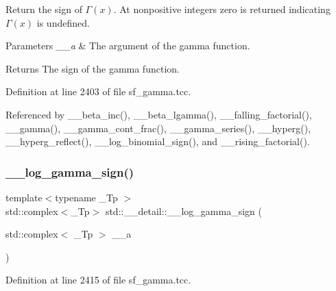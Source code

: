 Return the sign of $ \Gamma(x) $. At nonpositive integers zero is returned indicating $ \Gamma(x) $ is undefined. 


\begin{DoxyParams}{Parameters}
{\em \+\_\+\+\_\+a} & The argument of the gamma function. \\
\hline
\end{DoxyParams}
\begin{DoxyReturn}{Returns}
The sign of the gamma function. 
\end{DoxyReturn}


Definition at line 2403 of file sf\+\_\+gamma.\+tcc.



Referenced by \+\_\+\+\_\+beta\+\_\+inc(), \+\_\+\+\_\+beta\+\_\+lgamma(), \+\_\+\+\_\+falling\+\_\+factorial(), \+\_\+\+\_\+gamma(), \+\_\+\+\_\+gamma\+\_\+cont\+\_\+frac(), \+\_\+\+\_\+gamma\+\_\+series(), \+\_\+\+\_\+hyperg(), \+\_\+\+\_\+hyperg\+\_\+reflect(), \+\_\+\+\_\+log\+\_\+binomial\+\_\+sign(), and \+\_\+\+\_\+rising\+\_\+factorial().

\mbox{\label{namespacestd_1_1____detail_a4c87b679d9fa1ac20ebe3cb85becb266}} 
\subsubsection{\texorpdfstring{\+\_\+\+\_\+log\+\_\+gamma\+\_\+sign()}{\_\_log\_gamma\_sign()}\hspace{0.1cm}{\footnotesize\ttfamily [2/2]}}
{\footnotesize\ttfamily template$<$typename \+\_\+\+Tp $>$ \\
std\+::complex$<$\+\_\+\+Tp$>$ std\+::\+\_\+\+\_\+detail\+::\+\_\+\+\_\+log\+\_\+gamma\+\_\+sign (\begin{DoxyParamCaption}\item[{std\+::complex$<$ \+\_\+\+Tp $>$}]{\+\_\+\+\_\+a }\end{DoxyParamCaption})}



Definition at line 2415 of file sf\+\_\+gamma.\+tcc.

\mbox{\label{namespacestd_1_1____detail_a48998bae6619c9f63574af354b205074}} 
